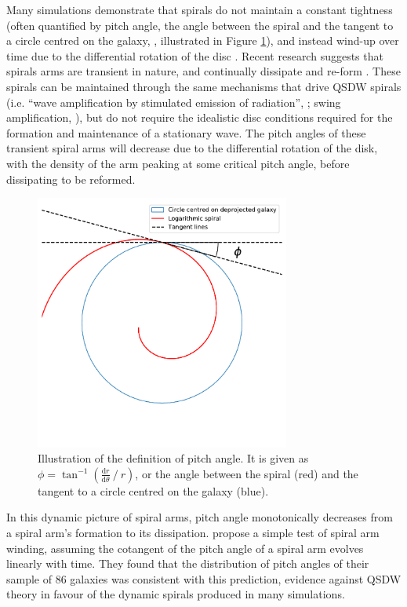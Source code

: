 Many simulations demonstrate that spirals do not maintain a constant tightness (often quantified by pitch angle, the angle between the spiral and the tangent to a circle centred on the galaxy, \citealt{1987gady.book.....B}, illustrated in Figure \ref{fig:pitch-angle-example}), and instead wind-up over time due to the differential rotation of the disc \citep{2013ApJ...763...46B}. Recent research suggests that spirals arms are transient in nature, and continually dissipate and re-form \citep{2014PASA...31...35D}. These spirals can be maintained through the same mechanisms that drive QSDW spirals (i.e. ``wave amplification by stimulated emission of radiation'', \citealt{1976ApJ...205..363M}; swing amplification, \citealt{1965MNRAS.130..125G}), but do not require the idealistic disc conditions required for the formation and maintenance of a stationary wave. The pitch angles of these transient spiral arms will decrease due to the differential rotation of the disk, with the density of the arm peaking at some critical pitch angle, before dissipating to be reformed.

\begin{figure}
  \includegraphics[width=8.4cm]{plots/pitch-angle-explanation.pdf}
  \caption{Illustration of the definition of pitch angle. It is given as $\phi = \tan^{-1}\left(\frac{\mathrm{d}r}{\mathrm{d}\theta}\ /\ r\right)$, or the angle between the spiral (red) and the tangent to a circle centred on the galaxy (blue).}
  \label{fig:pitch-angle-example}
\end{figure}

In this dynamic picture of spiral arms, pitch angle monotonically decreases from a spiral arm's formation to its dissipation. \citet{2019arXiv190910291P} propose a simple test of spiral arm winding, assuming the cotangent of the pitch angle of a spiral arm evolves linearly with time. They found that the distribution of pitch angles of their sample of 86 galaxies was consistent with this prediction, evidence against QSDW theory in favour of the dynamic spirals produced in many simulations.

